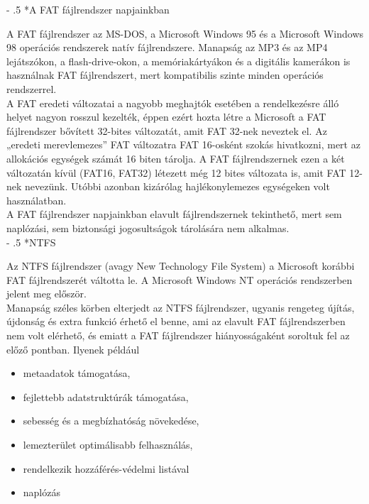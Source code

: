 \documentclass[tikz,12pt,margin=0px]{article}
\makeatletter
\renewcommand\paragraph{%
	\@startsection{paragraph}{4}{0mm}%
	{-\baselineskip}%
	{.5\baselineskip}%
	{\normalfont\normalsize\bfseries}}
\makeatother
\begin{document}
    \paragraph*{A FAT fájlrendszer napjainkban}

    \noindent A FAT fájlrendszer az MS-DOS, a Microsoft Windows 95 és a Microsoft Windows 98 operációs rendszerek natív fájlrendszere. Manapság az MP3 és az MP4 lejátszókon, a flash-drive-okon, a memóriakártyákon és a digitális kamerákon is használnak FAT fájlrendszert, mert kompatibilis szinte minden operációs rendszerrel.\\

    \noindent A FAT eredeti változatai a nagyobb meghajtók esetében a rendelkezésre álló helyet nagyon rosszul kezelték, éppen ezért hozta létre a Microsoft a FAT fájlrendszer bővített 32-bites változatát, amit FAT 32-nek neveztek el. Az „eredeti merevlemezes” FAT változatra FAT 16-osként szokás hivatkozni, mert az allokációs egységek számát 16 biten tárolja. A FAT fájlrendszernek ezen a két változatán kívül (FAT16, FAT32) létezett még 12 bites változata is, amit FAT 12-nek nevezünk. Utóbbi azonban kizárólag hajlékonylemezes egységeken volt használatban.\\

    \noindent A FAT fájlrendszer napjainkban elavult fájlrendszernek tekinthető, mert sem naplózási, sem biztonsági jogosultságok tárolására nem alkalmas.\\

	\paragraph*{NTFS}

    \noindent Az NTFS fájlrendszer (avagy New Technology File System) a Microsoft korábbi FAT fájlrendszerét váltotta le. A Microsoft Windows NT operációs rendszerben jelent meg először.\\

    \noindent Manapság széles körben elterjedt az NTFS fájlrendszer, ugyanis rengeteg újítás, újdonság és extra funkció érhető el benne, ami az elavult FAT fájlrendszerben nem volt elérhető, és emiatt a FAT fájlrendszer hiányosságaként soroltuk fel az előző pontban. Ilyenek például
    \begin{itemize}[topsep=8pt,itemsep=4pt,partopsep=4pt, parsep=4pt]
        \item metaadatok támogatása,
        \item fejlettebb adatstruktúrák támogatása,
        \item sebesség és a megbízhatóság növekedése,
        \item lemezterület optimálisabb felhasználás,
        \item rendelkezik hozzáférés-védelmi listával
        \item naplózás
    \end{itemize}
\end{document}
